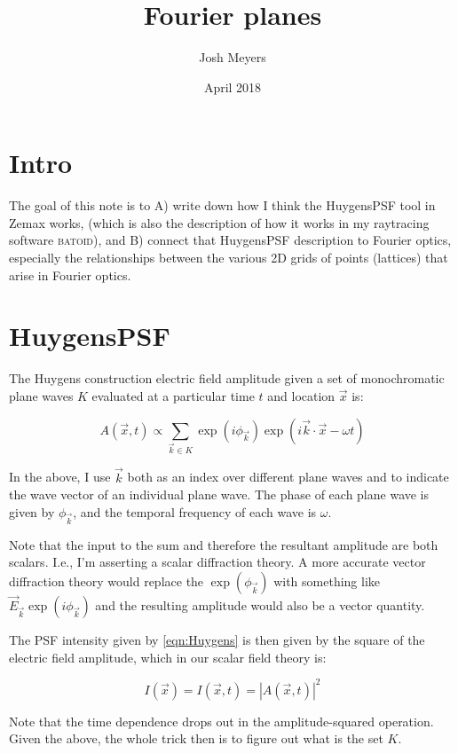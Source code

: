 \documentclass{article}
\title{Fourier planes}
\author{Josh Meyers}
\date{April 2018}
\begin{document}
\section{Intro}

The goal of this note is to A) write down how I think the HuygensPSF tool in Zemax works, (which is
also the description of how it works in my raytracing software \textsc{batoid}), and B) connect that
HuygensPSF description to Fourier optics, especially the relationships between the various 2D grids
of points (lattices) that arise in Fourier optics.

\section{HuygensPSF}

The Huygens construction electric field amplitude given a set of monochromatic plane waves $K$
evaluated at a particular time $t$ and location $\vec{x}$ is:

\begin{equation}
    A(\vec{x}, t) \propto \sum_{\vec{k} \in K} \exp\left(i \phi_{\vec{k}}\right) \exp\left( i \vec{k} \cdot \vec{x} - \omega t\right)
    \label{eqn:Huygens}
\end{equation}

In the above, I use $\vec{k}$ both as an index over different plane waves and to indicate the
wave vector of an individual plane wave.  The phase of each plane wave is given by $\phi_{\vec{k}}$,
and the temporal frequency of each wave is $\omega$.

Note that the input to the sum and therefore the resultant amplitude are both scalars.  I.e., I'm
asserting a scalar diffraction theory.  A more accurate vector diffraction theory would replace the
$\exp\left(\phi_{\vec{k}}\right)$ with something like $\vec{E}_{\vec{k}} \exp\left(i
\phi_{\vec{k}}\right)$ and the resulting amplitude would also be a vector quantity.

The PSF intensity given by \ref{eqn:Huygens} is then given by the square of the electric field
amplitude, which in our scalar field theory is:

\begin{equation}
    I(\vec{x}) = I(\vec{x}, t) = |A(\vec{x}, t)|^2
\end{equation}

Note that the time dependence drops out in the amplitude-squared operation.  Given the above, the
whole trick then is to figure out what is the set $K$.
\end{document}
